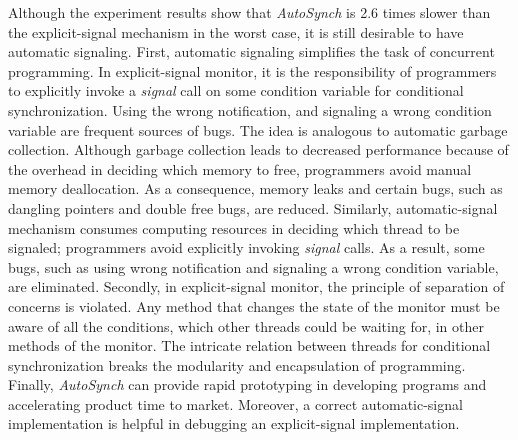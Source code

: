 \documentclass[preprint]{sigplanconf}
\begin{document}
Although the experiment results show that {\em AutoSynch} is 2.6 times slower than 
the explicit-signal mechanism in the worst case, it is still desirable to have automatic signaling.
First, automatic signaling simplifies the task of concurrent programming.
            In explicit-signal monitor, it is the responsibility of programmers to 
        explicitly invoke a {\em signal} call on some condition variable for
        conditional synchronization. Using the wrong notification, and signaling
        a wrong condition variable are frequent sources of bugs.  The idea is analogous to automatic
        garbage collection.
Although garbage collection leads to decreased
performance because of the overhead in deciding which memory to free, programmers 
avoid manual memory deallocation. As a consequence, memory leaks and certain 
bugs, such as dangling pointers and double free bugs, are reduced. 
Similarly, automatic-signal mechanism consumes computing resources 
in deciding which thread to be signaled; programmers avoid explicitly invoking 
{\em signal} calls. As a result, some bugs, such as using wrong notification and
signaling a wrong condition variable, are eliminated.  Secondly,
 in explicit-signal monitor, the principle of separation of concerns is violated.
    Any method that changes the state of the monitor must be aware of all the 
    conditions, which other threads could be waiting for, 
    in other methods of the monitor. 
     The intricate relation between
        threads for conditional synchronization breaks the modularity and 
        encapsulation of programming.  
   Finally,
  {\em AutoSynch} can provide  
        rapid prototyping  in developing programs and accelerating 
        product time to market. Moreover, 
        a correct
        automatic-signal implementation is helpful in debugging an
        explicit-signal implementation. 



\end{document}
